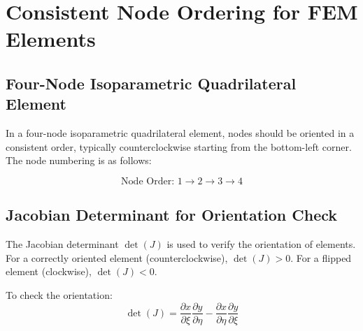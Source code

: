 \documentclass{article}
\begin{document}
\section*{Consistent Node Ordering for FEM Elements}

\subsection*{Four-Node Isoparametric Quadrilateral Element}

In a four-node isoparametric quadrilateral element, nodes should be oriented in a consistent order, typically counterclockwise starting from the bottom-left corner. The node numbering is as follows:

\[
\text{Node Order: } 1 \rightarrow 2 \rightarrow 3 \rightarrow 4
\]

\begin{center}
\end{center}

\subsection*{Jacobian Determinant for Orientation Check}

The Jacobian determinant \( \det(J) \) is used to verify the orientation of elements. For a correctly oriented element (counterclockwise), \( \det(J) > 0 \). For a flipped element (clockwise), \( \det(J) < 0 \).

To check the orientation:
\[
\det(J) = \frac{\partial x}{\partial \xi} \frac{\partial y}{\partial \eta} - \frac{\partial x}{\partial \eta} \frac{\partial y}{\partial \xi}
\]
\end{document}
